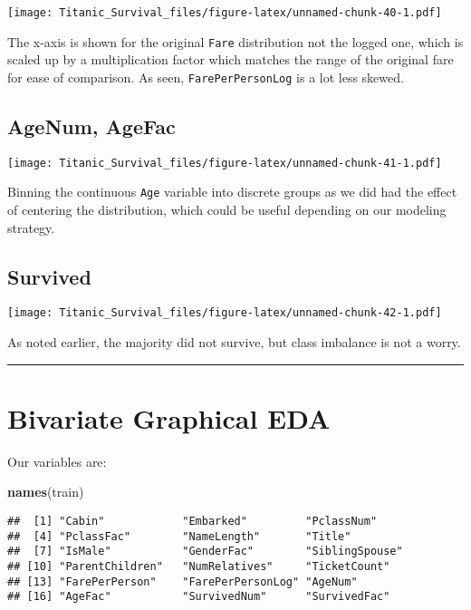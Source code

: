 \documentclass[]{article}
\newenvironment{Shaded}{\begin{snugshade}}{\end{snugshade}}
\newcommand{\KeywordTok}[1]{\textcolor[rgb]{0.13,0.29,0.53}{\textbf{#1}}}
\newcommand{\NormalTok}[1]{#1}
\begin{document}
\texttt{[image: Titanic\_Survival\_files/figure-latex/unnamed-chunk-40-1.pdf]}

The x-axis is shown for the original \texttt{Fare} distribution not the
logged one, which is scaled up by a multiplication factor which matches
the range of the original fare for ease of comparison. As seen,
\texttt{FarePerPersonLog} is a lot less skewed.

\subsection{AgeNum, AgeFac}\label{agenum-agefac}

\texttt{[image: Titanic\_Survival\_files/figure-latex/unnamed-chunk-41-1.pdf]}

Binning the continuous \texttt{Age} variable into discrete groups as we
did had the effect of centering the distribution, which could be useful
depending on our modeling strategy.

\subsection{Survived}\label{survived-1}

\texttt{[image: Titanic\_Survival\_files/figure-latex/unnamed-chunk-42-1.pdf]}

As noted earlier, the majority did not survive, but class imbalance is
not a worry.

\begin{center}\rule{0.5\linewidth}{\linethickness}\end{center}

\hypertarget{bigraphEDA-link}{\section{Bivariate Graphical
EDA}\label{bigraphEDA-link}}

Our variables are:

\begin{Shaded}
\begin{Highlighting}[]
\KeywordTok{names}\NormalTok{(train)}
\end{Highlighting}
\end{Shaded}

\begin{verbatim}
##  [1] "Cabin"            "Embarked"         "PclassNum"       
##  [4] "PclassFac"        "NameLength"       "Title"           
##  [7] "IsMale"           "GenderFac"        "SiblingSpouse"   
## [10] "ParentChildren"   "NumRelatives"     "TicketCount"     
## [13] "FarePerPerson"    "FarePerPersonLog" "AgeNum"          
## [16] "AgeFac"           "SurvivedNum"      "SurvivedFac"
\end{verbatim}
\end{document}
